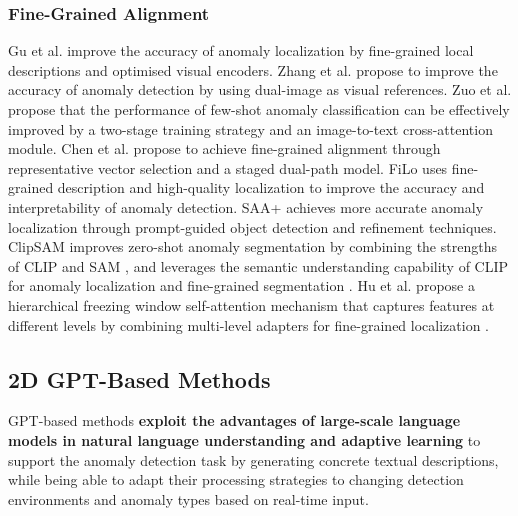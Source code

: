 \documentclass[journal,comsoc]{IEEEtran}
\begin{document}
\subsubsection{Fine-Grained Alignment}
Gu et al. \cite{gu2024filo} improve the accuracy of anomaly localization by fine-grained local descriptions and optimised visual encoders. Zhang et al. \cite{zhang2024dual} propose to improve the accuracy of anomaly detection by using dual-image as visual references. Zuo et al. \cite{zuo2024clipfsac} propose that the performance of few-shot anomaly classification can be effectively improved by a two-stage training strategy and an image-to-text cross-attention module. Chen et al. \cite{chen2024clipad} propose to achieve fine-grained alignment through representative vector selection and a staged dual-path model. FiLo uses fine-grained description and high-quality localization to improve the accuracy and interpretability of anomaly detection. SAA+ \cite{cao2023segment} achieves more accurate anomaly localization through prompt-guided object detection and refinement techniques. ClipSAM \cite{li2024clipsam} improves zero-shot anomaly segmentation by combining the strengths of CLIP and SAM \cite{wang2024sam}, and leverages the semantic understanding capability of CLIP for anomaly localization and fine-grained segmentation \cite{wang2022cris}. Hu et al. propose a hierarchical freezing window self-attention mechanism \cite{xing2024less} that captures features at different levels by combining multi-level adapters for fine-grained localization \cite{sun2022dualcoop}. 

\subsection{2D GPT-Based Methods}
GPT-based methods \textbf{exploit the advantages of large-scale language models in natural language understanding and adaptive learning} to support the anomaly detection task by generating concrete textual descriptions, while being able to adapt their processing strategies to changing detection environments and anomaly types based on real-time input. 
\end{document}

